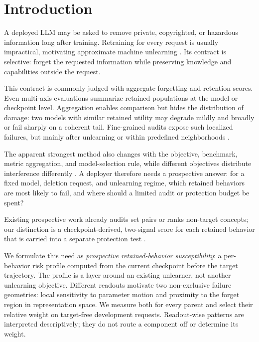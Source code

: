 \section{Introduction}
\label{sec:intro}

A deployed LLM may be asked to remove private, copyrighted, or hazardous
information long after training. Retraining for every request is usually
impractical, motivating approximate machine unlearning
\cite{cao2015towards,bourtoule2021machine,liu2024rethinking}. Its contract
is selective: forget the requested information while preserving knowledge
and capabilities outside the request.

This contract is commonly judged with aggregate forgetting and retention
scores. Even multi-axis evaluations summarize retained populations at the
model or checkpoint level. Aggregation enables comparison but hides the
distribution of damage: two models with similar retained utility may
degrade mildly and broadly or fail sharply on a coherent tail. Fine-grained
audits expose such localized failures, but mainly after unlearning or within
predefined neighborhoods
\cite{chang2025retain,cheng2026entanglement,ko2025holes}.

The apparent strongest method also changes with the objective, benchmark,
metric aggregation, and model-selection rule, while different objectives
distribute interference differently
\cite{thaker2024position,dorna2025openunlearning,wang2025gradient}. A
deployer therefore needs a prospective answer: for a fixed model, deletion
request, and unlearning regime, which retained behaviors are most likely to
fail, and where should a limited audit or protection budget be spent?

Existing prospective work already audits set pairs or ranks non-target
concepts; our distinction is a checkpoint-derived, two-signal score for each
retained behavior that is carried into a separate protection test
\cite{su2026preunlearn,anonymous2026neighbors}.

We formulate this need as \emph{prospective retained-behavior
susceptibility}: a per-behavior risk profile computed from the current
checkpoint before the target trajectory. The profile is a layer around an
existing unlearner, not another unlearning objective. Different readouts
motivate two non-exclusive failure geometries: local sensitivity to parameter
motion and proximity to the forget region in representation space. We measure
both for every parent and select their relative weight on target-free
development requests. Readout-wise patterns are interpreted descriptively;
they do not route a component off or determine its weight.

